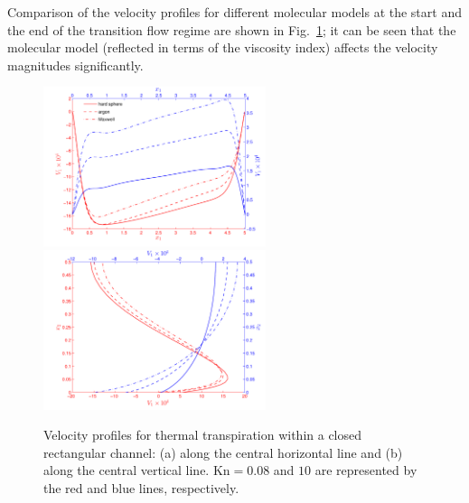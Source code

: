 Comparison of the velocity profiles for different molecular models at the start and the end of the transition flow regime  are shown in Fig.~\ref{thermal_creep_v}; it can be seen that the molecular model (reflected in terms of the viscosity index) affects the velocity magnitudes significantly. 

\begin{figure}[t]
	\centering
	{\includegraphics[width=6.5cm]{Chapter4/IMG/tch.pdf}}\hskip 0.4cm
	{\includegraphics[width=6.5cm]{Chapter4/IMG/tcv.pdf}}
	\caption{Velocity profiles for thermal transpiration within a closed rectangular channel: (a) along the central horizontal line and (b) along the central vertical line. $\text{Kn}=0.08$ and $10$ are represented by the red and blue lines, respectively.} 
	\label{thermal_creep_v}
\end{figure}



